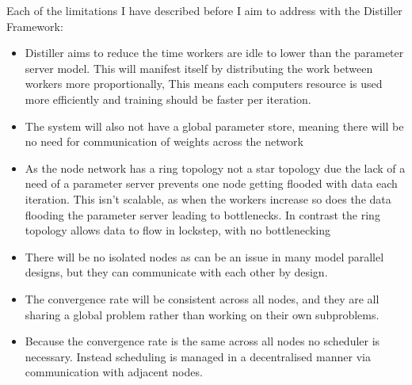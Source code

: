 Each of the limitations I have described before I aim to address with the
Distiller Framework:
\begin{itemize}
    \item Distiller aims to reduce the time workers are idle to lower than the
    parameter server model. This will manifest itself by distributing the work
    between workers more proportionally, This means each computers resource is
    used more efficiently and training should be faster per iteration.
    \item The system will also not have a global parameter store, meaning there
    will be no need for communication of weights across the network
    \item As the node network has a ring topology not a star topology due the
    lack of a need of a parameter server prevents one node getting flooded with
    data each iteration. This isn't scalable, as when the workers increase so
    does the data flooding the parameter server leading to bottlenecks. In
    contrast the ring topology allows data to flow in lockstep, with no
    bottlenecking
    \item There will be no isolated nodes as can be an issue in many model
    parallel designs, but they can communicate with each other by design.
    \item The convergence rate will be consistent across all nodes, and they are
    all sharing a global problem rather than working on their own subproblems.
    \item Because the convergence rate is the same across all nodes no scheduler
    is necessary. Instead scheduling is managed in a decentralised manner via
    communication with adjacent nodes.
\end{itemize}






  












